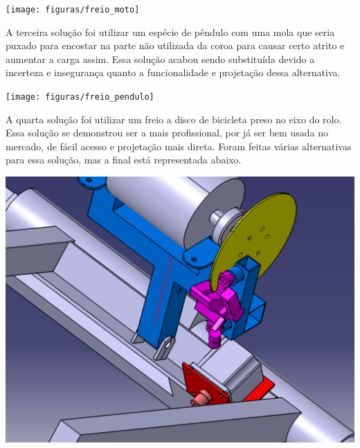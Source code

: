     \begin{center}
        \texttt{[image: figuras/freio\_moto]}
        \label{freio_moto}
    \end{center} 

    A terceira solução foi utilizar um espécie de pêndulo com uma mola que seria puxado para encostar na parte não utilizada da coroa para causar certo atrito e aumentar a carga assim. Essa solução acabou sendo substituída devido a incerteza e insegurança quanto a funcionalidade e projetação dessa alternativa.

    \begin{center}
        \texttt{[image: figuras/freio\_pendulo]}
        \label{freio_pendulo}
    \end{center} 

    A quarta solução foi utilizar um freio a disco de bicicleta preso no eixo do rolo. Essa solução se demonstrou ser a mais profissional, por já ser bem usada no mercado, de fácil acesso e projetação mais direta. Foram feitas várias alternativas para essa solução, mas a final está representada abaixo.

    \begin{center}
        \includegraphics[scale=0.5]{figuras/carga_peso}
        \label{carga_peso}
    \end{center} 
    
